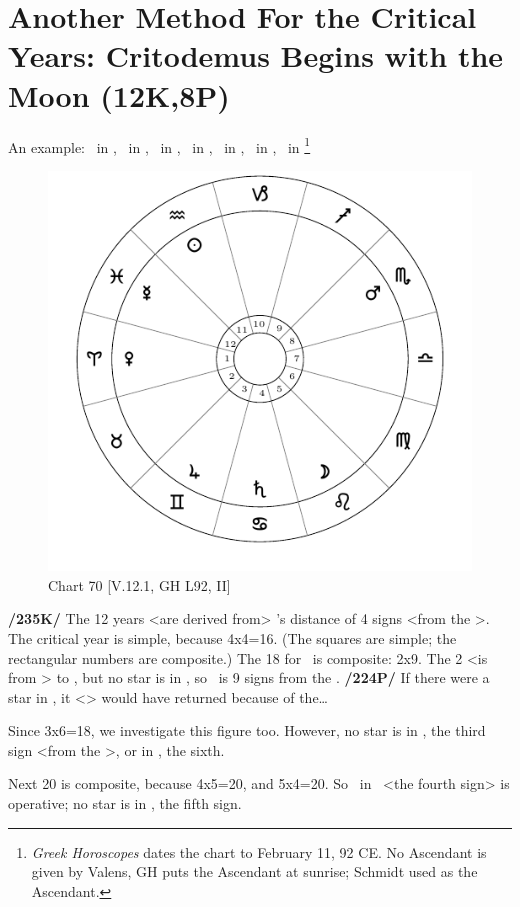 \section{Another Method For the Critical Years: Critodemus Begins with the Moon (12K,8P)}
An example: \Sun\, in \Aquarius, \Moon\, in \Leo, \Saturn\, in \Cancer, \Jupiter\, in \Gemini, \Mars\, in \Scorpio, \Venus\, in \Aries, \Mercury\, in \Pisces\footnote{\textit{Greek Horoscopes} dates the chart to February 11, 92 CE. No Ascendant is given by Valens, GH puts the Ascendant at sunrise; Schmidt used \Aries as the Ascendant.} 

\begin{figure}
\centering
\vspace{-20pt}
\includegraphics[width=.68\textwidth]{charts/5_12_1}
\caption{Chart 70 [V.12.1, GH L92, II]}
\label{fig:chart70}
\end{figure}

\noindent\textbf{/235K/} The 12 years <are derived from> \Mars’s distance of 4 signs <from the \Moon>. The critical year is simple, because 4x4=16. (The squares are simple; the rectangular numbers are composite.) The 18 for \Venus\, is composite: 2x9. The 2 <is from \Leo> to \Virgo, but no star is in \Virgo, so \Venus\, is 9 signs from the \Moon. \textbf{/224P/} If there were a star in \Virgo, it <\Venus> would have returned because of the…

Since 3x6=18, we investigate this figure too. However, no star is in \Libra, the third sign <from the \Moon>, or in \Capricorn, the sixth.

Next 20 is composite, because 4x5=20, and 5x4=20. So \Mars\, in \Scorpio\, <the fourth sign> is operative; no star is in \Sagittarius, the fifth sign.

